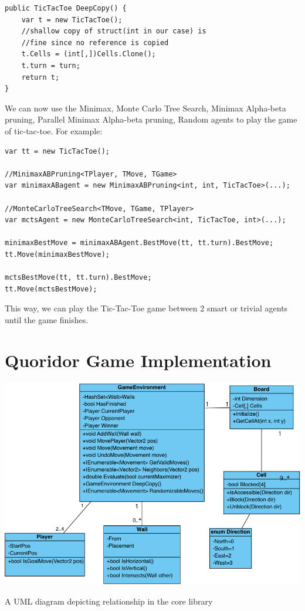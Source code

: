 \begin{lstlisting}
public TicTacToe DeepCopy() {
    var t = new TicTacToe();
    //shallow copy of struct(int in our case) is
    //fine since no reference is copied
    t.Cells = (int[,])Cells.Clone();
    t.turn = turn;
    return t;
}
\end{lstlisting}

We can now use the Minimax, Monte Carlo Tree Search, Minimax Alpha-beta pruning, Parallel Minimax Alpha-beta pruning, Random agents to play the game of tic-tac-toe. For example:

\begin{lstlisting}
var tt = new TicTacToe();

//MinimaxABPruning<TPlayer, TMove, TGame>
var minimaxABagent = new MinimaxABPruning<int, int, TicTacToe>(...);

//MonteCarloTreeSearch<TMove, TGame, TPlayer>
var mctsAgent = new MonteCarloTreeSearch<int, TicTacToe, int>(...);

minimaxBestMove = minimaxABAgent.BestMove(tt, tt.turn).BestMove;
tt.Move(minimaxBestMove);

mctsBestMove(tt, tt.turn).BestMove;
tt.Move(mctsBestMove);
\end{lstlisting}

This way, we can play the Tic-Tac-Toe game between 2 smart or trivial agents until the game finishes.

\section{Quoridor Game Implementation}\label{sec:gameimplementation}

\begin{Figure}[!ht]
    \centering
    \includegraphics[width=.95\linewidth]{../img/uml_core.png}
    \caption{A UML diagram depicting relationship in the core library}
    \label{fig:core_uml}
\end{Figure}

